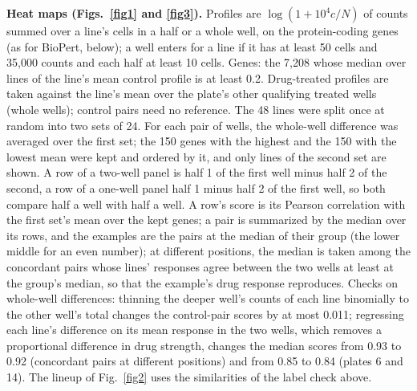 \documentclass[pdflatex,sn-nature]{sn-jnl}
\begin{document}
\textbf{Heat maps (Figs.~\ref{fig1} and \ref{fig3}).} Profiles are $\log(1+10^4c/N)$ of counts summed over a line's cells in a half or a whole well, on the protein-coding genes (as for BioPert, below); a well enters for a line if it has at least 50 cells and 35,000 counts and each half at least 10 cells. Genes: the 7,208 whose median over lines of the line's mean control profile is at least 0.2. Drug-treated profiles are taken against the line's mean over the plate's other qualifying treated wells (whole wells); control pairs need no reference. The 48 lines were split once at random into two sets of 24. For each pair of wells, the whole-well difference was averaged over the first set; the 150 genes with the highest and the 150 with the lowest mean were kept and ordered by it, and only lines of the second set are shown. A row of a two-well panel is half 1 of the first well minus half 2 of the second, a row of a one-well panel half 1 minus half 2 of the first well, so both compare half a well with half a well. A row's score is its Pearson correlation with the first set's mean over the kept genes; a pair is summarized by the median over its rows, and the examples are the pairs at the median of their group (the lower middle for an even number); at different positions, the median is taken among the concordant pairs whose lines' responses agree between the two wells at least at the group's median, so that the example's drug response reproduces. Checks on whole-well differences: thinning the deeper well's counts of each line binomially to the other well's total changes the control-pair scores by at most 0.011; regressing each line's difference on its mean response in the two wells, which removes a proportional difference in drug strength, changes the median scores from 0.93 to 0.92 (concordant pairs at different positions) and from 0.85 to 0.84 (plates 6 and 14). The lineup of Fig.~\ref{fig2} uses the similarities of the label check above.
\end{document}
